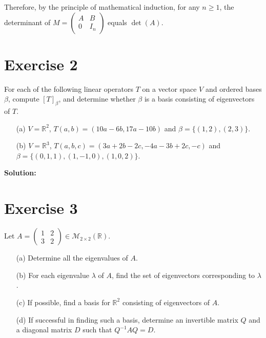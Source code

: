 \documentclass{article}
\begin{document}
Therefore, by the principle of mathematical induction, for any $n \geq 1$, the determinant of $M = \begin{pmatrix} A & B \\ 0 & I_n \end{pmatrix}$ equals $\det(A)$.

\newpage

\section*{Exercise 2}
For each of the following linear operators $T$ on a vector space $V$ and ordered bases $\beta$, compute $[T]_\beta$, and determine whether $\beta$ is a basis consisting of eigenvectors of $T$.

\begin{enumerate}
    \item[(a)] $V = \mathbb{R}^2$, $T(a,b) = (10a - 6b, 17a - 10b)$ and $\beta = \{(1,2),(2,3)\}$.

    \item[(b)] $V = \mathbb{R}^3$, $T(a,b,c) = (3a + 2b - 2c, -4a - 3b + 2c, -c)$ and $\beta = \{(0,1,1),(1,-1,0),(1,0,2)\}$.
\end{enumerate}

\textbf{Solution:} \\



\newpage

\section*{Exercise 3}
Let $A = \begin{pmatrix} 1 & 2 \\ 3 & 2 \end{pmatrix} \in \mathcal{M}_{2\times 2}(\mathbb{R})$.

\begin{enumerate}
    \item[(a)] Determine all the eigenvalues of $A$.

    \item[(b)] For each eigenvalue $\lambda$ of $A$, find the set of eigenvectors corresponding to $\lambda$.

    \item[(c)] If possible, find a basis for $\mathbb{R}^2$ consisting of eigenvectors of $A$.

    \item[(d)] If successful in finding such a basis, determine an invertible matrix $Q$ and a diagonal matrix $D$ such that $Q^{-1}AQ = D$.
\end{enumerate}
\end{document}
